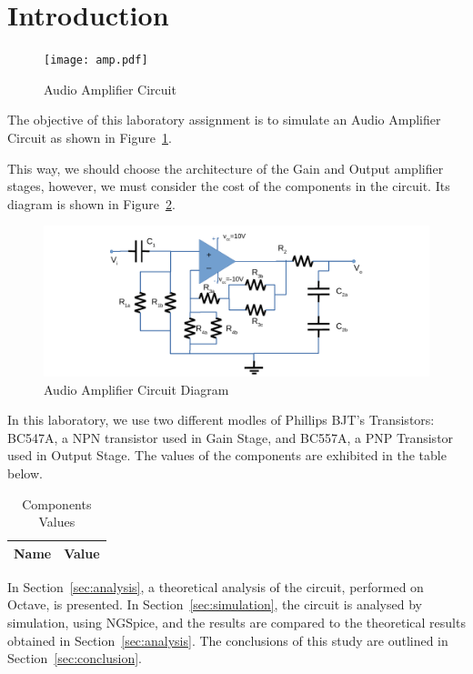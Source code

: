 \section{Introduction}
\label{sec:introduction}
\begin{figure}[H] \centering
\texttt{[image: amp.pdf]}
\caption{Audio Amplifier Circuit}                                     
\label{fig:amp}
\end{figure}
The objective of this laboratory assignment is to simulate an Audio Amplifier Circuit as shown in Figure~\ref{fig:amp}. 

This way, we should choose the architecture of the Gain and Output amplifier stages, however, we must consider the cost of the components in the circuit. Its diagram is shown in Figure~\ref{fig:circuit}.
\begin{figure}[H] \centering
\includegraphics[width=0.8\linewidth]{circuit.pdf}
\caption{Audio Amplifier Circuit Diagram}                                     
\label{fig:circuit}
\end{figure}
In this laboratory, we use two different modles of Phillips BJT's Transistors: BC547A, a NPN transistor used in Gain Stage, and BC557A, a PNP Transistor used in Output Stage.
The values of the components are exhibited in the table below.
\begin{table}[H]
  \centering
  \begin{tabular}{|l|r|}
     \hline    
    {\bf Name} & {\bf Value} \\ \hline   
    
  \end{tabular}
  \caption{Components Values}
  \label{tab:datags}
\end{table}

In Section~\ref{sec:analysis}, a theoretical analysis of the circuit, 
performed on Octave, is presented. In Section~\ref{sec:simulation}, the 
circuit is analysed by simulation, using NGSpice, and the results are compared to 
the theoretical results obtained in Section~\ref{sec:analysis}. The conclusions 
of this study are outlined in Section~\ref{sec:conclusion}.


